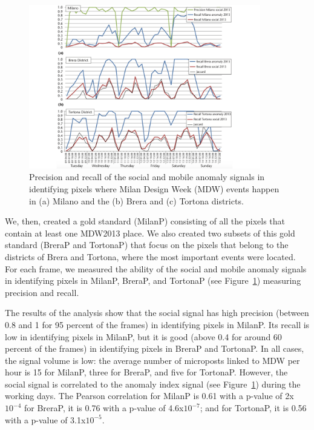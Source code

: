 \begin{figure}[t]
\begin{center}
\includegraphics[width=0.90\textwidth]{img/mdw-prec-rec} 
\caption{Precision and recall of the social and mobile anomaly signals in identifying pixels where Milan Design Week (MDW) events happen in (a) Milano and the (b) Brera and (c) Tortona districts.}
\label{fig:mdw-prec-rec}
\end{center}
\end{figure}

We, then, created a gold standard (MilanP) consisting of all the pixels that contain at least one MDW2013 place. We also created two subsets of this gold standard (BreraP and TortonaP) that focus on the pixels that belong to the districts of Brera and Tortona, where the most important events were located. 
For each frame, we measured the ability of the social and mobile anomaly signals in identifying pixels in MilanP, BreraP, and TortonaP (see Figure~\ref{fig:mdw-prec-rec}) measuring precision and recall.

The results of the analysis show that the social signal has high precision (between 0.8 and 1 for 95 percent of the frames) in identifying pixels in MilanP. Its recall is low in identifying pixels in MilanP, but it is good (above 0.4 for around 60 percent of the frames) in identifying pixels in BreraP and TortonaP. In all cases, the signal volume is low: the average number of microposts linked to MDW per hour is 15 for MilanP, three for BreraP, and five for TortonaP.
However, the social signal is correlated to the anomaly index signal (see Figure~\ref{fig:mdw-prec-rec}) during the working days. The Pearson correlation for MilanP is 0.61 with a p-value of 2x$10^{-4}$ for BreraP, it is 0.76 with a p-value of 4.6x$10^{-7}$; and for TortonaP, it is 0.56 with a p-value of 3.1x$10^{-5}$. 

